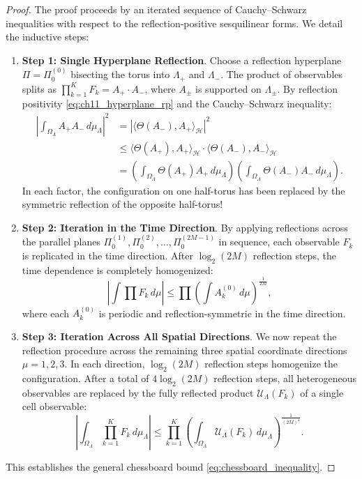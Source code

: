 \begin{proof}
The proof proceeds by an iterated sequence of Cauchy--Schwarz inequalities with respect to the reflection-positive sesquilinear forms. We detail the inductive steps:
\begin{enumerate}
    \item \textbf{Step 1: Single Hyperplane Reflection}. Choose a reflection hyperplane $\Pi = \Pi_0^{(0)}$ bisecting the torus into $\Lambda_+$ and $\Lambda_-$. The product of observables splits as $\prod_{k=1}^K F_k = A_+ \cdot A_-$, where $A_\pm$ is supported on $\Lambda_\pm$. By reflection positivity \eqref{eq:ch11_hyperplane_rp} and the Cauchy--Schwarz inequality:
    \begin{align}
    \left| \int_{\Omega_\Lambda} A_+ A_- \, d\mu_\Lambda \right|^2 &= \left| \langle \Theta(A_-), A_+ \rangle_{\mathcal{H}} \right|^2 \nonumber \\
    &\le \langle \Theta(A_+), A_+ \rangle_{\mathcal{H}} \cdot \langle \Theta(A_-), A_- \rangle_{\mathcal{H}} \nonumber \\
    &= \left( \int_{\Omega_\Lambda} \Theta(A_+) A_+ \, d\mu_\Lambda \right) \left( \int_{\Omega_\Lambda} \Theta(A_-) A_- \, d\mu_\Lambda \right).
    \end{align}
    In each factor, the configuration on one half-torus has been replaced by the symmetric reflection of the opposite half-torus!
    \item \textbf{Step 2: Iteration in the Time Direction}. By applying reflections across the parallel planes $\Pi_0^{(1)}, \Pi_0^{(2)}, \dots, \Pi_0^{(2M-1)}$ in sequence, each observable $F_k$ is replicated in the time direction. After $\log_2(2M)$ reflection steps, the time dependence is completely homogenized:
    \begin{equation}
    \left| \int \prod F_k \, d\mu \right| \le \prod \left( \int A_k^{(0)} \, d\mu \right)^{\frac{1}{2M}},
    \end{equation}
    where each $A_k^{(0)}$ is periodic and reflection-symmetric in the time direction.
    \item \textbf{Step 3: Iteration Across All Spatial Directions}. We now repeat the reflection procedure across the remaining three spatial coordinate directions $\mu = 1, 2, 3$. In each direction, $\log_2(2M)$ reflection steps homogenize the configuration. After a total of $4 \log_2(2M)$ reflection steps, all heterogeneous observables are replaced by the fully reflected product $\mathcal{U}_\Lambda(F_k)$ of a single cell observable:
    \begin{equation}
    \left| \int_{\Omega_\Lambda} \prod_{k=1}^K F_k \, d\mu_\Lambda \right| \le \prod_{k=1}^K \left( \int_{\Omega_\Lambda} \mathcal{U}_\Lambda(F_k) \, d\mu_\Lambda \right)^{\frac{1}{(2M)^4}}.
    \end{equation}
\end{enumerate}
This establishes the general chessboard bound \eqref{eq:chessboard_inequality}.
\end{proof}


